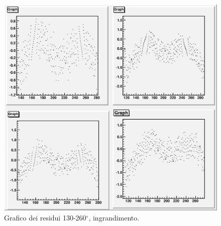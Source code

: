 \documentclass[italian,a4paper]{article}
\begin{document}
\begin{figure}[h]
    \begin{center}
        \includegraphics[height=0.4\textheight, width=.9\textwidth]{grafici/130-260r.big.eps}
    \end{center}
    \caption{Grafico dei residui 130-260$^\circ$, ingrandimento.}
    \label{fig:130260rbig}
\end{figure}
\end{document}
